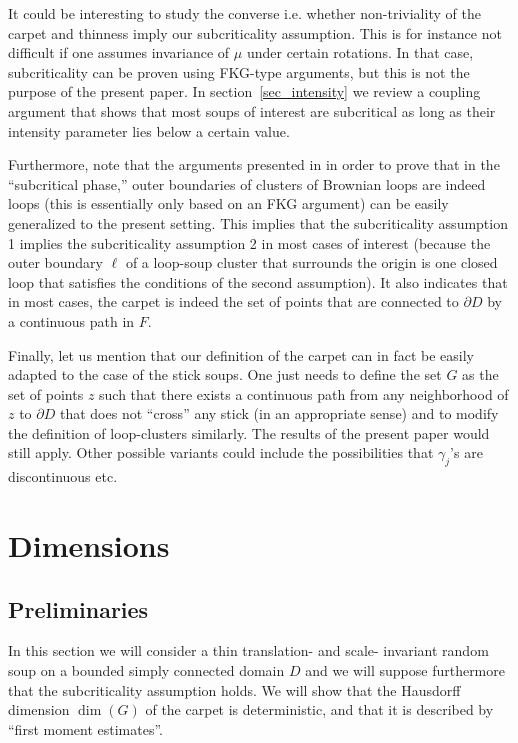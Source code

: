 \documentclass[11pt]{article}
\begin{document}
It could be interesting to study the converse i.e. whether non-triviality of the carpet 
and thinness imply our subcriticality assumption.
This is for instance not difficult if one assumes invariance of $\mu$ 
under certain rotations.
In that case, subcriticality can be proven using FKG-type arguments,
but this is not the purpose of the present paper. 
In section~\ref{sec_intensity} we review a coupling argument that shows
that most soups of interest are subcritical as long as their intensity
parameter lies below a certain value.

Furthermore, note that the arguments presented in \cite {ShW2} in order to prove that in the 
``subcritical phase,'' outer boundaries of clusters of Brownian loops are 
indeed loops (this is essentially only based on an FKG argument) can be easily generalized to the present setting. This implies that the subcriticality assumption 1 implies the subcriticality assumption 2 in most cases of interest (because the outer boundary $\ell$ of a loop-soup cluster that surrounds the origin is one closed loop that satisfies the conditions of the second assumption). It also indicates that in most cases, the carpet is indeed the set of points that are connected to $\partial D$ by a continuous path in $F$.

Finally, let us mention that our definition of the carpet can in fact be easily adapted to the case of the stick soups. One just needs to define the set $G$ as the set of points $z$
such that there exists a continuous path from any neighborhood of $z$ to $\partial D$ that does not ``cross'' any stick (in an appropriate sense) and to modify the definition of loop-clusters similarly. The results of the present paper would still apply.  
Other possible variants could include the possibilities that $\gamma_j$'s are discontinuous etc.


\section {Dimensions}

\subsection {Preliminaries}

In this section we will consider a thin translation- and scale- invariant random soup
on a bounded simply connected domain $D$ and we will suppose furthermore 
that the subcriticality assumption holds.
We will show that the Hausdorff dimension $\dim (G)$ of the carpet is deterministic, and that it is 
described by ``first moment estimates''.
\end{document}
